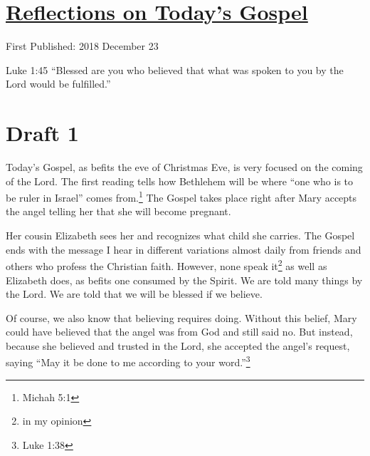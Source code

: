 \documentclass[12pt]{article}[titlepage]
\newcommand{\say}[1]{``#1''}
\newcommand{\1}{\={a}}
\newcommand{\2}{\={e}}
\newcommand{\3}{\={\i}}
\newcommand{\4}{\=o}
\newcommand{\5}{\=u}
\newcommand{\6}{\={A}}
\renewcommand{\,}{\textsuperscript{,}}
\begin{document}
\doublespacing
\section{\href{reflections-on-readings-4-advent-c.html}{Reflections on Today's Gospel}}
First Published: 2018 December 23

Luke 1:45 \say{Blessed are you who believed that what was spoken to you by the Lord would be fulfilled.}

\section{Draft 1}
Today's Gospel, as befits the eve of Christmas Eve, is very focused on the coming of the Lord.
The first reading tells how Bethlehem will be where \say{one who is to be ruler in Israel} comes from.\footnote{Michah 5:1}
The Gospel takes place right after Mary accepts the angel telling her that she will become pregnant.

Her cousin Elizabeth sees her and recognizes what child she carries.
The Gospel ends with the message I hear in different variations almost daily from friends and others who profess the Christian faith.
However, none speak it\footnote{in my opinion} as well as Elizabeth does, as befits one consumed by the Spirit.
We are told many things by the Lord.
We are told that we will be blessed if we believe.

Of course, we also know that believing requires doing.
Without this belief, Mary could have believed that the angel was from God and still said no.
But instead, because she believed and trusted in the Lord, she accepted the angel's request, saying \say{May it be done to me according to your word.}\footnote{Luke 1:38}
\end{document}
